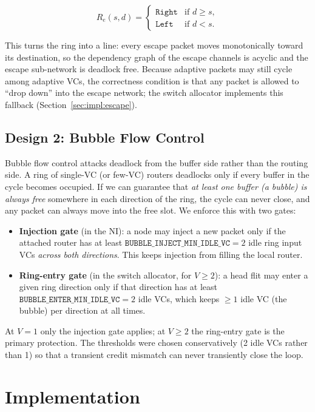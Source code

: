 \documentclass[11pt,a4paper]{article}
\begin{document}
\[
  R_e(s,d) = \begin{cases}
    \texttt{Right} & \text{if } d \ge s,\\
    \texttt{Left}  & \text{if } d < s.
  \end{cases}
\]

This turns the ring into a line: every escape packet moves monotonically toward
its destination, so the dependency graph of the escape channels is acyclic and
the escape sub-network is deadlock free.  Because adaptive packets may still
cycle among adaptive VCs, the correctness condition is that any packet is
allowed to ``drop down'' into the escape network; the switch allocator
implements this fallback (Section~\ref{sec:impl:escape}).

\subsection{Design 2: Bubble Flow Control}
\label{sec:arch:bubble}
Bubble flow control attacks deadlock from the buffer side rather than the
routing side.  A ring of single-VC (or few-VC) routers deadlocks only if every
buffer in the cycle becomes occupied.  If we can guarantee that \emph{at least
one buffer (a bubble) is always free} somewhere in each direction of the ring,
the cycle can never close, and any packet can always move into the free slot.
We enforce this with two gates:

\begin{itemize}[itemsep=1pt, topsep=2pt]
  \item \textbf{Injection gate} (in the NI): a node may inject a new packet
        only if the attached router has at least
        $\texttt{BUBBLE\_INJECT\_MIN\_IDLE\_VC}=2$ idle ring input VCs
        \emph{across both directions}.  This keeps injection from filling the
        local router.
  \item \textbf{Ring-entry gate} (in the switch allocator, for $V \ge 2$): a
        head flit may enter a given ring direction only if that direction has
        at least $\texttt{BUBBLE\_ENTER\_MIN\_IDLE\_VC}=2$ idle VCs, which
        keeps $\ge 1$ idle VC (the bubble) per direction at all times.
\end{itemize}

At $V=1$ only the injection gate applies; at $V \ge 2$ the ring-entry gate is
the primary protection.  The thresholds were chosen conservatively (2 idle VCs
rather than 1) so that a transient credit mismatch can never transiently close
the loop.

\section{Implementation}
\label{sec:impl}
\end{document}
